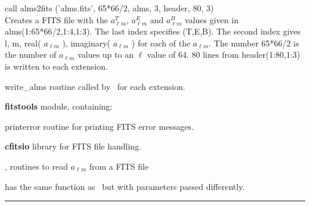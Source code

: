 \begin{example}
{
call alms2fits ('alms.fits', 65*66/2, alms, 3, header, 80, 3)  \\
}
{
Creates a FITS file with the $a_{\ell m}^T$, $a_{\ell m}^E$ and $a_{\ell m}^B$ values given in alms(1:65*66/2,1:4,1:3). The last index specifies (T,E,B). The second index gives l, m, real( $a_{\ell m}$ ), imaginary( $a_{\ell m}$ ) for each of the $a_{\ell m}$. The number 65*66/2 is the number of  $a_{\ell m}$  values up to an $\ell$ value of 64. 80 lines from header(1:80,1:3) is written to each extension.
}
\end{example}

\begin{modules}
  \begin{sulist}{} %
  \item[write\_alms] routine called by \thedocid\ for each extension.
  \item[\textbf{fitstools}] module, containing:
  \item[printerror] routine for printing FITS error messages.
  \item[\textbf{cfitsio}] library for FITS file handling.		
  \end{sulist}
\end{modules}
\newpage
\begin{related}
  \begin{sulist}{} %
  \item[\htmlref{fits2alms}{sub:fits2alms},
  \htmlref{read\_conbintab}{sub:read_conbintab}] routines to read $a_{\ell m}$ from
  a FITS file 
  \item[\htmlref{dump\_alms}{sub:dump_alms}] has the same function as \thedocid\ but with parameters passed differently.
  \end{sulist}
\end{related}

\rule{\hsize}{2mm}

\newpage
